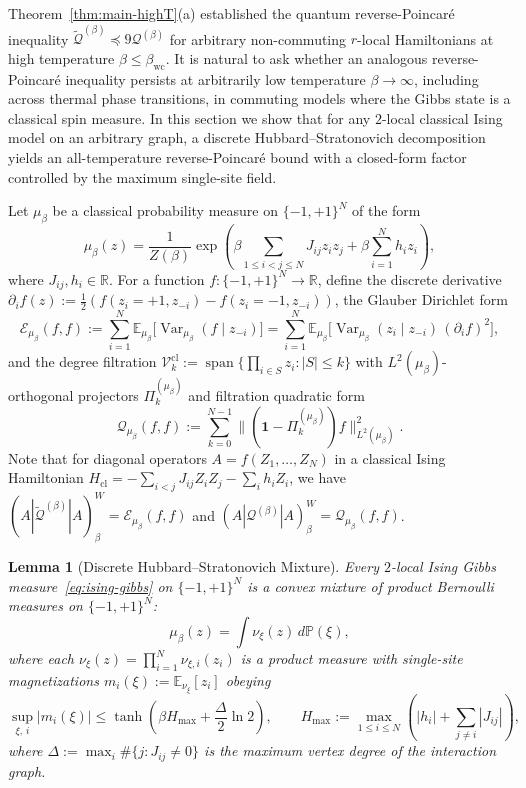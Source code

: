 \documentclass[11pt,a4paper]{article}
\numberwithin{equation}{section}
\theoremstyle{plain}
\newtheorem{lemma}[theorem]{Lemma}
\theoremstyle{definition}
\newcommand{\Var}{\operatorname{Var}}
\newcommand{\E}{\mathbb{E}}
\begin{document}
Theorem~\ref{thm:main-highT}(a) established the quantum reverse-Poincar\'e inequality $\widetilde{\mathcal{Q}}^{(\beta)}\preceq 9\mathcal{Q}^{(\beta)}$ for arbitrary non-commuting $r$-local Hamiltonians at high temperature $\beta\le\beta_{\mathrm{wc}}$. It is natural to ask whether an analogous reverse-Poincar\'e inequality persists at arbitrarily low temperature $\beta\to\infty$, including across thermal phase transitions, in commuting models where the Gibbs state is a classical spin measure. In this section we show that for any $2$-local classical Ising model on an arbitrary graph, a discrete Hubbard--Stratonovich decomposition yields an all-temperature reverse-Poincar\'e bound with a closed-form factor controlled by the maximum single-site field.

Let $\mu_\beta$ be a classical probability measure on $\{-1,+1\}^N$ of the form
\begin{equation}\label{eq:ising-gibbs}
  \mu_\beta(z) = \frac{1}{Z(\beta)}\exp\!\left(\beta\sum_{1\le i<j\le N} J_{ij} z_i z_j + \beta\sum_{i=1}^N h_i z_i\right),
\end{equation}
where $J_{ij}, h_i\in\mathbb{R}$. For a function $f:\{-1,+1\}^N\to\mathbb{R}$, define the discrete derivative $\partial_i f(z) := \frac{1}{2}(f(z_i=+1,z_{-i}) - f(z_i=-1,z_{-i}))$, the Glauber Dirichlet form
\[
  \mathcal{E}_{\mu_\beta}(f,f) := \sum_{i=1}^N \E_{\mu_\beta}\bigl[\Var_{\mu_\beta}(f\mid z_{-i})\bigr]
  = \sum_{i=1}^N \E_{\mu_\beta}\bigl[\Var_{\mu_\beta}(z_i\mid z_{-i})\,(\partial_i f)^2\bigr],
\]
and the degree filtration $\mathcal{V}_k^{\mathrm{cl}} := \operatorname{span}\{\prod_{i\in S} z_i : |S|\le k\}$ with $L^2(\mu_\beta)$-orthogonal projectors $\Pi_k^{(\mu_\beta)}$ and filtration quadratic form
\[
  \mathcal{Q}_{\mu_\beta}(f,f) := \sum_{k=0}^{N-1}\bigl\|(\mathbf{1}-\Pi_k^{(\mu_\beta)})f\bigr\|_{L^2(\mu_\beta)}^2.
\]
Note that for diagonal operators $A = f(Z_1,\dots,Z_N)$ in a classical Ising Hamiltonian $H_{\mathrm{cl}} = -\sum_{i<j} J_{ij} Z_i Z_j - \sum_i h_i Z_i$, we have $(A|\widetilde{\mathcal{Q}}^{(\beta)}|A)_\beta^W = \mathcal{E}_{\mu_\beta}(f,f)$ and $(A|\mathcal{Q}^{(\beta)}|A)_\beta^W = \mathcal{Q}_{\mu_\beta}(f,f)$.

\begin{lemma}[Discrete Hubbard--Stratonovich Mixture]\label{lem:hs-mixture}
Every $2$-local Ising Gibbs measure~\eqref{eq:ising-gibbs} on $\{-1,+1\}^N$ is a convex mixture of product Bernoulli measures on $\{-1,+1\}^N$:
\[
  \mu_\beta(z) = \int \nu_\xi(z)\,d\mathbb{P}(\xi),
\]
where each $\nu_\xi(z) = \prod_{i=1}^N \nu_{\xi,i}(z_i)$ is a product measure with single-site magnetizations $m_i(\xi) := \E_{\nu_\xi}[z_i]$ obeying
\begin{equation}\label{eq:hs-mag}
  \sup_{\xi,\,i} |m_i(\xi)| \le \tanh\!\left(\beta H_{\max} + \frac{\Delta}{2}\ln 2\right), \qquad
  H_{\max} := \max_{1\le i\le N}\left(|h_i| + \sum_{j\ne i}|J_{ij}|\right),
\end{equation}
where $\Delta := \max_i \#\{j : J_{ij}\ne 0\}$ is the maximum vertex degree of the interaction graph.
\end{lemma}
\end{document}
